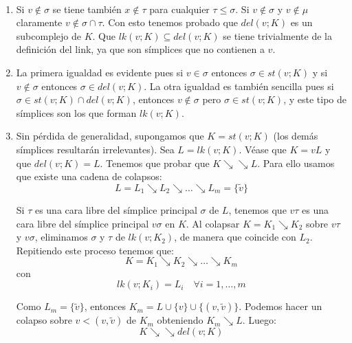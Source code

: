 \documentclass[twoside]{article}
\begin{document}
\begin{solucion}\
\begin{enumerate}
\item Si $v\notin\sigma$ se tiene también $x\notin\tau$ para cualquier $\tau\leq\sigma$. Si $v\notin\sigma$ y $v\notin\mu$ claramente $v\notin \sigma\cap\tau$. Con esto tenemos probado que $del(v;K)$ es un subcomplejo de $K$. Que $lk(v;K)\subseteq del(v;K)$ se tiene trivialmente de la definición del link, ya que son símplices que no contienen a $v$.

\item La primera igualdad es evidente pues si $v\in \sigma$ entonces $\sigma\in st(v;K)$ y si $v\notin\sigma$ entonces $\sigma\in del(v;K)$. La otra igualdad es también sencilla pues si $\sigma\in st(v;K)\cap del(v;K)$, entonces $v\notin \sigma$ pero $\sigma\in st(v;K)$, y este tipo de símplices son los que forman $lk(v;K)$. 

\item Sin pérdida de generalidad, supongamos que $K=st(v;K)$ (los demás símplices resultarán irrelevantes). Sea $L=lk(v;K)$.
Véase que $K=vL$ y que $del(v;K) = L$.
Tenemos que probar que $K \searrow\!\!\searrow L$.
Para ello usamos que existe una cadena de colapsos:
\[ L = L_1 \searrow L_2 \searrow \dots \searrow L_m = \{\tilde{v}\} \]

Si $τ$ es una cara libre del símplice principal $σ$ de $L$, tenemos que $vτ$ es una cara libre del símplice principal $vσ$ en $K$.
Al colapsar $K=K_1 \searrow K_2$ sobre $vτ$ y $vσ$, eliminamos $σ$ y $τ$ de $lk(v;K_2)$, de manera que coincide con $L_2$.
Repitiendo este proceso tenemos que:
\[ K = K_1 \searrow K_2 \searrow \dots \searrow K_m \]
con
\[ lk(v;K_i) = L_i\quad \forall i=1,\dots,m \]

Como $L_m = \{\tilde{v}\}$, entonces $K_m = L \cup \{v\} \cup \{(v,\tilde{v})\}$.
Podemos hacer un colapso sobre $v<(v,\tilde{v})$ de $K_m$ obteniendo $K_m \searrow L$.
Luego:
\[ K \searrow\!\!\searrow del(v;K) \]
\end{enumerate}
\end{solucion}
\end{document}
